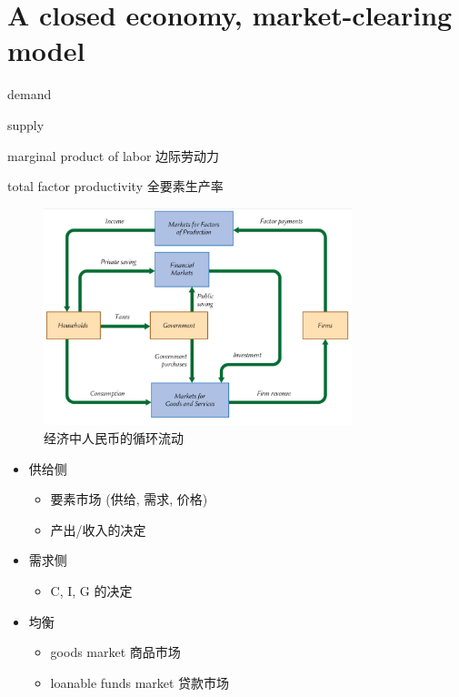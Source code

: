\section{A closed economy, market-clearing model}
\begin{introduction}[Keywords]
    \item demand 
    \item supply 
    \item marginal product of labor 边际劳动力
    \item total factor productivity 全要素生产率
\end{introduction}
\begin{figure}[htbp]
    \centering
    \includegraphics[width=0.8\textwidth]{image/RMBflow.png}
    \caption{经济中人民币的循环流动}
\end{figure}
\begin{itemize}
    \item 供给侧 
    \begin{itemize}
        \item 要素市场 (供给, 需求, 价格)
        \item 产出/收入的决定
    \end{itemize}
    \item 需求侧 
    \begin{itemize}
        \item C, I, G 的决定
    \end{itemize}
    \item 均衡
    \begin{itemize}
        \item goods market 商品市场
        \item loanable funds market 贷款市场
    \end{itemize}
\end{itemize}
\newpage
